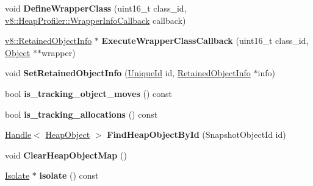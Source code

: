 \begin{DoxyCompactItemize}
\item 
void {\bfseries Define\+Wrapper\+Class} (uint16\+\_\+t class\+\_\+id, \hyperlink{classv8_1_1_heap_profiler_a677025dd201fd832e0464e5ab0b0d0d4}{v8\+::\+Heap\+Profiler\+::\+Wrapper\+Info\+Callback} callback)\hypertarget{classv8_1_1internal_1_1_heap_profiler_a4e741b3c78bcfc59084d52ec8d0148d1}{}\label{classv8_1_1internal_1_1_heap_profiler_a4e741b3c78bcfc59084d52ec8d0148d1}

\item 
\hyperlink{classv8_1_1_retained_object_info}{v8\+::\+Retained\+Object\+Info} $\ast$ {\bfseries Execute\+Wrapper\+Class\+Callback} (uint16\+\_\+t class\+\_\+id, \hyperlink{classv8_1_1internal_1_1_object}{Object} $\ast$$\ast$wrapper)\hypertarget{classv8_1_1internal_1_1_heap_profiler_a2c74f3148efb1f50112d7fc85174a1aa}{}\label{classv8_1_1internal_1_1_heap_profiler_a2c74f3148efb1f50112d7fc85174a1aa}

\item 
void {\bfseries Set\+Retained\+Object\+Info} (\hyperlink{classv8_1_1_unique_id}{Unique\+Id} id, \hyperlink{classv8_1_1_retained_object_info}{Retained\+Object\+Info} $\ast$info)\hypertarget{classv8_1_1internal_1_1_heap_profiler_a4c52d185ebd72396c8dc516e57460712}{}\label{classv8_1_1internal_1_1_heap_profiler_a4c52d185ebd72396c8dc516e57460712}

\item 
bool {\bfseries is\+\_\+tracking\+\_\+object\+\_\+moves} () const \hypertarget{classv8_1_1internal_1_1_heap_profiler_ade0e230273e763a248b5ee7ffdbf92ce}{}\label{classv8_1_1internal_1_1_heap_profiler_ade0e230273e763a248b5ee7ffdbf92ce}

\item 
bool {\bfseries is\+\_\+tracking\+\_\+allocations} () const \hypertarget{classv8_1_1internal_1_1_heap_profiler_a7e91fb5deacee6c270a6e0a0def9bd79}{}\label{classv8_1_1internal_1_1_heap_profiler_a7e91fb5deacee6c270a6e0a0def9bd79}

\item 
\hyperlink{classv8_1_1internal_1_1_handle}{Handle}$<$ \hyperlink{classv8_1_1internal_1_1_heap_object}{Heap\+Object} $>$ {\bfseries Find\+Heap\+Object\+By\+Id} (Snapshot\+Object\+Id id)\hypertarget{classv8_1_1internal_1_1_heap_profiler_adf0791d9132710ee924b9e5c0bacd486}{}\label{classv8_1_1internal_1_1_heap_profiler_adf0791d9132710ee924b9e5c0bacd486}

\item 
void {\bfseries Clear\+Heap\+Object\+Map} ()\hypertarget{classv8_1_1internal_1_1_heap_profiler_aabb83158ff4b7d07a8972e140217d696}{}\label{classv8_1_1internal_1_1_heap_profiler_aabb83158ff4b7d07a8972e140217d696}

\item 
\hyperlink{classv8_1_1internal_1_1_isolate}{Isolate} $\ast$ {\bfseries isolate} () const \hypertarget{classv8_1_1internal_1_1_heap_profiler_ac4b4bd6f8c6fdd6b4f8606291ade5a52}{}\label{classv8_1_1internal_1_1_heap_profiler_ac4b4bd6f8c6fdd6b4f8606291ade5a52}

\end{DoxyCompactItemize}
